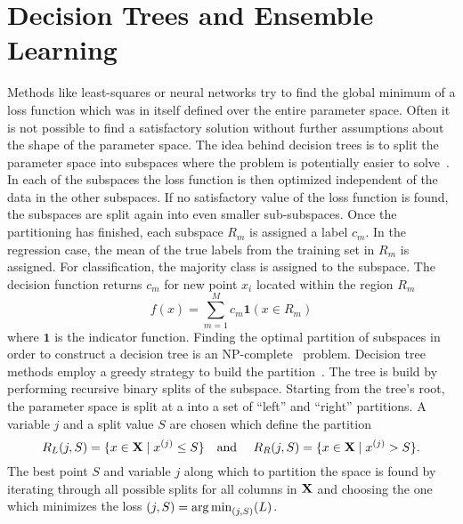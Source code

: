 \section{Decision Trees and Ensemble Learning}
\label{sec:trees}
Methods like least-squares or neural networks try to find the global minimum of a loss function which was in itself defined over the entire parameter space.
Often it is not possible to find a satisfactory solution without further assumptions about the shape of the parameter space.
The idea behind decision trees is to split the parameter space into subspaces where the problem is potentially easier to solve~\cite[305]{hasties}.
In each of the subspaces the loss function is then optimized independent of the data in the other subspaces. 
If no satisfactory value of the loss function is found, the subspaces are split again into even smaller sub-subspaces.
Once the partitioning has finished, each subspace $R_m$ is assigned a label $c_m$. In the regression case, the mean of the true labels from the training set in $R_m$ is assigned. 
For classification, the majority class is assigned to the subspace.
The decision function returns $c_m$ for new point $x_i$ located within the region $R_m$
\begin{equation*}
    f(x) = \sum_{m=1}^{M} c_m \mathbf{1}(x \in R_m)    
\end{equation*}
where $\mathbf{1}$ is the indicator function.
Finding the optimal partition of subspaces in order to construct a decision tree is an NP-complete~\cite{dt_np_complete} problem.
Decision tree methods employ a greedy strategy to build the partition~\cite[307]{hasties}. 
The tree is build by performing recursive binary splits of the subspace.
Starting from the tree's root, the parameter space is split at a into a set of \enquote{left} and \enquote{right} partitions.
A variable $j$ and a split value $S$ are chosen which define the partition 
\begin{equation*}
    R_L(j, S) =  \{x \in \mathbf{X} \mid x^{(j)}  \leq S \} \text{\quad and \quad} R_R(j, S) =  \{x \in \mathbf{X} \mid x^{(j)}  > S \}.
\end{equation*}
The best point $S$ and variable $j$ along which to partition the space is found by iterating through all possible
splits for all columns in $\mathbf{X}$ and choosing the one which minimizes the loss $(j, S) = \operatorname*{arg\,min}_{(j, S)}(L)$.

